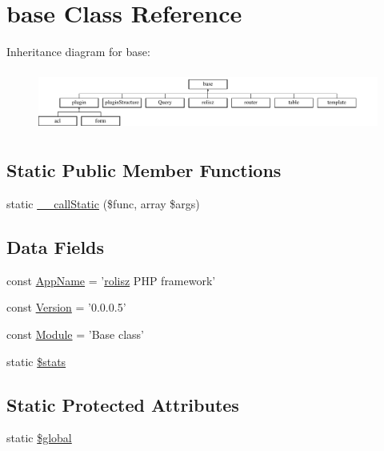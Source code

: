 \hypertarget{classbase}{
\section{base Class Reference}
\label{classbase}
}
Inheritance diagram for base:\begin{figure}[H]
\begin{center}
\leavevmode
\includegraphics[height=2.000000cm]{classbase}
\end{center}
\end{figure}
\subsection*{Static Public Member Functions}
\begin{DoxyCompactItemize}
\item 
static \hyperlink{classbase_a9fa8e32de2139fd5e55c102dcdf9120f}{\_\-\_\-callStatic} (\$func, array \$args)
\end{DoxyCompactItemize}
\subsection*{Data Fields}
\begin{DoxyCompactItemize}
\item 
const \hyperlink{classbase_aab75444b144ffc4e972a9170e0a76ec0}{AppName} = '\hyperlink{classrolisz}{rolisz} PHP framework'
\item 
const \hyperlink{classbase_a62e44de9100d83ee01f5b4875b49a02b}{Version} = '0.0.0.5'
\item 
const \hyperlink{classbase_a2c348358c1db4bb5136855f7f31e1157}{Module} = 'Base class'
\item 
static \hyperlink{classbase_ac61adefb58583938c9b820405ddfa018}{\$stats}
\end{DoxyCompactItemize}
\subsection*{Static Protected Attributes}
\begin{DoxyCompactItemize}
\item 
static \hyperlink{classbase_aad844777d9d6beb4ca7c92d97afe7d27}{\$global}
\end{DoxyCompactItemize}
